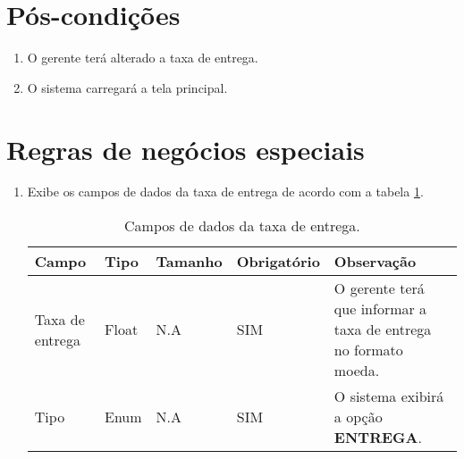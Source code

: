 \section{Pós-condições}

\begin{enumerate}
	\item O gerente terá alterado a taxa de entrega.
	\item O sistema carregará a tela principal.	
\end{enumerate}

\section{Regras de negócios especiais}

\begin{enumerate}[label=RN\arabic*]
	\item Exibe os campos de dados da taxa de entrega de acordo com a tabela \ref{uc006_tb_rn1}. \label{uc006_rn:1}
	\begin{table}[htb]
		\ABNTEXfontereduzida
		\caption[Campos de dados da taxa de entrega]{Campos de dados da taxa de entrega.}
		\label{uc006_tb_rn1}
		\begin{tabular}{|p{3.0cm}|p{2.0cm}|p{1.5cm}|p{2.0cm}|p{5.75cm}|}
			\hline
			\textbf{Campo}  & \textbf{Tipo} & \textbf{Tamanho} & \textbf{Obrigatório} & \textbf{Observação}                                             \\ \hline
			Taxa de entrega & Float         & N.A              & SIM                  & O gerente terá que informar a taxa de entrega no formato moeda. \\ \hline
			Tipo            & Enum          & N.A              & SIM                  & O sistema exibirá a opção \textbf{ENTREGA}.                     \\ \hline
		\end{tabular}
	\end{table}
\end{enumerate}
